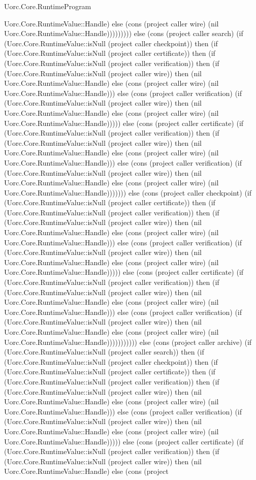 \begin{lexlean}{Uorc.Core.RuntimeProgram}
\begin{semanticmodule}
{Uorc.Core.RuntimeValue::Handle) else (cons (project caller wire) (nil Uorc.Core.RuntimeValue::Handle))))))))) else (cons (project caller search) (if (Uorc.Core.RuntimeValue::isNull (project caller checkpoint)) then (if (Uorc.Core.RuntimeValue::isNull (project caller certificate)) then (if (Uorc.Core.RuntimeValue::isNull (project caller verification)) then (if (Uorc.Core.RuntimeValue::isNull (project caller wire)) then (nil Uorc.Core.RuntimeValue::Handle) else (cons (project caller wire) (nil Uorc.Core.RuntimeValue::Handle))) else (cons (project caller verification) (if (Uorc.Core.RuntimeValue::isNull (project caller wire)) then (nil Uorc.Core.RuntimeValue::Handle) else (cons (project caller wire) (nil Uorc.Core.RuntimeValue::Handle))))) else (cons (project caller certificate) (if (Uorc.Core.RuntimeValue::isNull (project caller verification)) then (if (Uorc.Core.RuntimeValue::isNull (project caller wire)) then (nil Uorc.Core.RuntimeValue::Handle) else (cons (project caller wire) (nil Uorc.Core.RuntimeValue::Handle))) else (cons (project caller verification) (if (Uorc.Core.RuntimeValue::isNull (project caller wire)) then (nil Uorc.Core.RuntimeValue::Handle) else (cons (project caller wire) (nil Uorc.Core.RuntimeValue::Handle))))))) else (cons (project caller checkpoint) (if (Uorc.Core.RuntimeValue::isNull (project caller certificate)) then (if (Uorc.Core.RuntimeValue::isNull (project caller verification)) then (if (Uorc.Core.RuntimeValue::isNull (project caller wire)) then (nil Uorc.Core.RuntimeValue::Handle) else (cons (project caller wire) (nil Uorc.Core.RuntimeValue::Handle))) else (cons (project caller verification) (if (Uorc.Core.RuntimeValue::isNull (project caller wire)) then (nil Uorc.Core.RuntimeValue::Handle) else (cons (project caller wire) (nil Uorc.Core.RuntimeValue::Handle))))) else (cons (project caller certificate) (if (Uorc.Core.RuntimeValue::isNull (project caller verification)) then (if (Uorc.Core.RuntimeValue::isNull (project caller wire)) then (nil Uorc.Core.RuntimeValue::Handle) else (cons (project caller wire) (nil Uorc.Core.RuntimeValue::Handle))) else (cons (project caller verification) (if (Uorc.Core.RuntimeValue::isNull (project caller wire)) then (nil Uorc.Core.RuntimeValue::Handle) else (cons (project caller wire) (nil Uorc.Core.RuntimeValue::Handle))))))))))) else (cons (project caller archive) (if (Uorc.Core.RuntimeValue::isNull (project caller search)) then (if (Uorc.Core.RuntimeValue::isNull (project caller checkpoint)) then (if (Uorc.Core.RuntimeValue::isNull (project caller certificate)) then (if (Uorc.Core.RuntimeValue::isNull (project caller verification)) then (if (Uorc.Core.RuntimeValue::isNull (project caller wire)) then (nil Uorc.Core.RuntimeValue::Handle) else (cons (project caller wire) (nil Uorc.Core.RuntimeValue::Handle))) else (cons (project caller verification) (if (Uorc.Core.RuntimeValue::isNull (project caller wire)) then (nil Uorc.Core.RuntimeValue::Handle) else (cons (project caller wire) (nil Uorc.Core.RuntimeValue::Handle))))) else (cons (project caller certificate) (if (Uorc.Core.RuntimeValue::isNull (project caller verification)) then (if (Uorc.Core.RuntimeValue::isNull (project caller wire)) then (nil Uorc.Core.RuntimeValue::Handle) else (cons (project }
\end{semanticmodule}
\end{lexlean}
